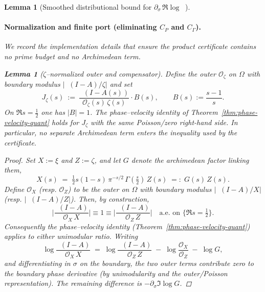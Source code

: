 \documentclass[11pt]{article}
\newtheorem{lemma}[theorem]{Lemma}
\theoremstyle{definition}
\theoremstyle{remark}
\DeclareMathOperator{\dettwo}{det_2}
\begin{document}
\begin{lemma}[Smoothed distributional bound for $\partial_\sigma\,\Re\log\dettwo$]
\paragraph{Normalization and finite port (eliminating $C_P$ and $C_\Gamma$).}
We record the implementation details that ensure the product certificate contains no prime budget and no Archimedean term.

\begin{lemma}[\(\zeta\)–normalized outer and compensator]\label{lem:zeta-normalization}
Define the outer $\mathcal O_\zeta$ on $\Omega$ with boundary modulus $\big|\dettwo(I-A)/\zeta\big|$ and set
\[ J_\zeta(s)\ :=\ \frac{\dettwo(I-A(s))}{\mathcal O_\zeta(s)\,\zeta(s)}\cdot B(s),\qquad B(s):=\frac{s-1}{s}. \]
On $\Re s=\tfrac12$ one has $|B|=1$. The phase–velocity identity of Theorem~\ref{thm:phase-velocity-quant} holds for $J_\zeta$ with the same Poisson/zero right-hand side. In particular, no separate Archimedean term enters the inequality used by the certificate.
\end{lemma}

\begin{proof}
Set $X:=\xi$ and $Z:=\zeta$, and let $G$ denote the archimedean factor linking them,
\[
  X(s)\;=\;\tfrac12 s(1{-}s)\,\pi^{-s/2}\,\Gamma(\tfrac s2)\,Z(s)\;=:\;G(s)\,Z(s).
\]
Define $\mathcal O_X$ (resp. $\mathcal O_Z$) to be the outer on $\Omega$ with boundary modulus $\big|\dettwo(I{-}A)/X\big|$ (resp. $\big|\dettwo(I{-}A)/Z\big|$). Then, by construction,
\[
  \Big|\frac{\dettwo(I{-}A)}{\mathcal O_X\,X}\Big|\equiv 1\equiv \Big|\frac{\dettwo(I{-}A)}{\mathcal O_Z\,Z}\Big|\quad \text{a.e. on }\{\Re s=\tfrac12\}.
\]
Consequently the phase--velocity identity (Theorem~\ref{thm:phase-velocity-quant}) applies to either unimodular ratio. Writing
\[
  \log \frac{\dettwo(I{-}A)}{\mathcal O_X\,X}
  \;=\; \log \frac{\dettwo(I{-}A)}{\mathcal O_Z\,Z}\; -\; \log\frac{\mathcal O_X}{\mathcal O_Z}\; -\; \log G,
\]
and differentiating in $\sigma$ on the boundary, the two outer terms contribute zero to the boundary phase derivative (by unimodularity and the outer/Poisson representation). The remaining difference is $-\partial_\sigma\Im\log G$.


\end{proof}
\end{lemma}
\end{document}
